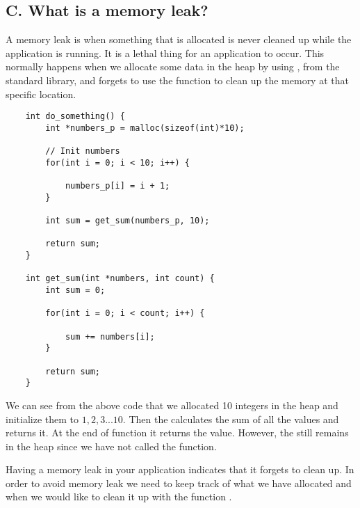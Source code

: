 \subsection{C. What is a memory leak?}
A memory leak is when something that is allocated is never cleaned up while the application is running. 
It is a lethal thing for an application to occur. This normally happens when we allocate some data in the heap
by using , from the standard library, and forgets to use the function  to clean up the memory
at that specific location.

\begin{lstlisting}
    int do_something() {
        int *numbers_p = malloc(sizeof(int)*10);

        // Init numbers
        for(int i = 0; i < 10; i++) {

            numbers_p[i] = i + 1;
        }

        int sum = get_sum(numbers_p, 10);
        
        return sum;
    }

    int get_sum(int *numbers, int count) {
        int sum = 0;

        for(int i = 0; i < count; i++) {

            sum += numbers[i];
        }

        return sum;
    }
\end{lstlisting}
We can see from the above code that we allocated 10 integers in the heap and initialize them 
to $1, 2, 3 ... 10$. Then the  calculates the sum of all the values and returns it.
At the end of function  it returns the  value. However, the 
still remains in the heap since we have not called the  function.

Having a memory leak in your application indicates that it forgets to clean up.
In order to avoid memory leak we need to keep track of what we have allocated and when we would like to clean it up with the function .

